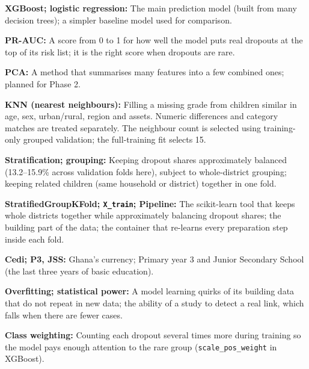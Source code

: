 \documentclass[conference,a4paper]{IEEEtran}
\newcommand{\var}[1]{\texttt{#1}}
\begin{document}
{\noindent\textbf{XGBoost; logistic regression:} The main prediction model (built from many decision trees); a simpler baseline model used for comparison.\par\vspace{2pt}
\noindent\textbf{PR-AUC:} A score from 0 to 1 for how well the model puts real dropouts at the top of its risk list; it is the right score when dropouts are rare.\par\vspace{2pt}
\noindent\textbf{PCA:} A method that summarises many features into a few combined ones; planned for Phase 2.\par\vspace{2pt}
\noindent\textbf{KNN (nearest neighbours):} Filling a missing grade from children similar in age, sex, urban/rural, region and assets. Numeric differences and category matches are treated separately. The neighbour count is selected using training-only grouped validation; the full-training fit selects 15.\par\vspace{2pt}
\noindent\textbf{Stratification; grouping:} Keeping dropout shares approximately balanced (13.2--15.9\% across validation folds here), subject to whole-district grouping; keeping related children (same household or district) together in one fold.\par\vspace{2pt}
\noindent\textbf{StratifiedGroupKFold; \var{X\_train}; Pipeline:} The scikit-learn tool that keeps whole districts together while approximately balancing dropout shares; the building part of the data; the container that re-learns every preparation step inside each fold.\par\vspace{2pt}
\noindent\textbf{Cedi; P3, JSS:} Ghana's currency; Primary year 3 and Junior Secondary School (the last three years of basic education).\par\vspace{2pt}
\noindent\textbf{Overfitting; statistical power:} A model learning quirks of its building data that do not repeat in new data; the ability of a study to detect a real link, which falls when there are fewer cases.\par\vspace{2pt}
\noindent\textbf{Class weighting:} Counting each dropout several times more during training so the model pays enough attention to the rare group (\var{scale\_pos\_weight} in XGBoost).\par\vspace{2pt}
}
\end{document}
